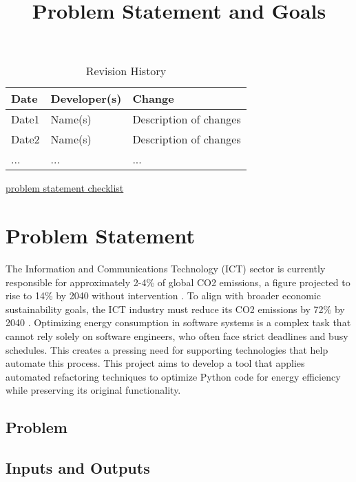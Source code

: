 \documentclass{article}
\title{Problem Statement and Goals\\\progname}
\author{\authname}
\date{}
\begin{document}
\maketitle

\begin{table}[hp]
  \caption{Revision History} \label{TblRevisionHistory}
  \begin{tabularx}{\textwidth}{llX}
    \toprule
    \textbf{Date} & \textbf{Developer(s)} & \textbf{Change}\\
    \midrule
    Date1 & Name(s) & Description of changes\\
    Date2 & Name(s) & Description of changes\\
    ... & ... & ...\\
    \bottomrule
  \end{tabularx}
\end{table}
\href{https://github.com/smiths/capTemplate/blob/main/docs/Checklists/ProbState-Checklist.pdf}
{problem statement checklist}

\section{Problem Statement}

The Information and Communications Technology (ICT) sector is currently responsible for approximately 2-4\% of global CO2 emissions, a figure projected to rise to 14\% by 2040 without intervention \citep{BelkhirAndElmeligi2018}. To align with broader economic sustainability goals, the ICT industry must reduce its CO2 emissions by 72\% by 2040 \citep{FreitagAndBernersLee2021}. Optimizing energy consumption in software systems is a complex task that cannot rely solely on software engineers, who often face strict deadlines and busy schedules. This creates a pressing need for supporting technologies that help automate this process. This project aims to develop a tool that applies automated refactoring techniques to optimize Python code for energy efficiency while preserving its original functionality. 


\subsection{Problem}

\subsection{Inputs and Outputs}

\end{document}

